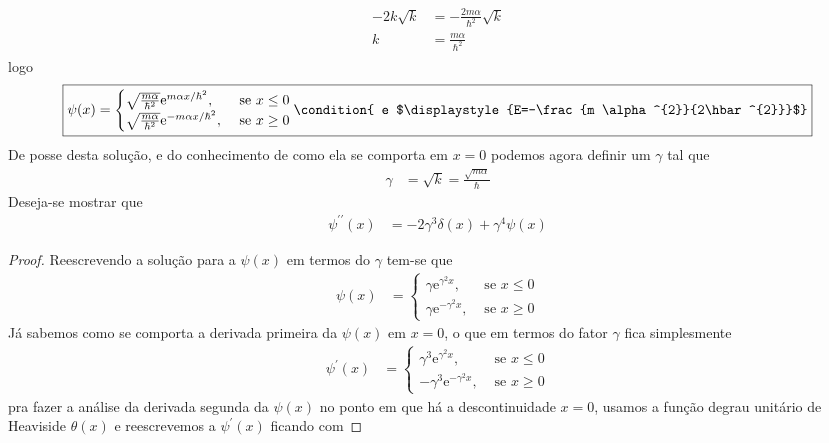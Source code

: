\begin{prob}
\begin{sol}
\begin{enumerate}[label=\alph *)]
\begin{align}
						\begin{split}
							-2k\sqrt{k} &= -\frac{2m \alpha}{\hbar^{2}}\sqrt{k}\\
							k &= \frac{m \alpha}{\hbar^{2}}
						\end{split}
					\end{align}
					logo
					\begin{align}
							\boxed{
								\psi(x) = 
								\begin{cases}
									\sqrt{\frac{m \alpha}{\hbar^{2}}}\mathrm{e}^{m\alpha  x/\hbar^{2}}, &\text{ se }x\leq 0\\
									\sqrt{\frac{m \alpha}{\hbar^{2}}}\mathrm{e}^{-m \alpha x/\hbar^{2}}, &\text{ se }x\geq 0
								\end{cases}
								\condition{ e $\displaystyle{E=-\frac{m \alpha^{2}}{2\hbar^{2}}}$}
							}
					\end{align}
					De posse desta solução, e do conhecimento de como ela se comporta em $x=0$ podemos agora definir um $\gamma$ tal que
					\begin{align}
						\gamma &= \sqrt{k} = \frac{\sqrt{m \alpha}}{\hbar}
					\end{align}
					Deseja-se mostrar que
					\begin{align}
						\psi^{\prime \prime}(x) &= -2 \gamma^{3} \delta(x)+\gamma^{4} \psi(x)
					\end{align}
					\begin{proof}
						Reescrevendo a solução para a $\psi(x)$ em termos do $\gamma$ tem-se que
						\begin{align}
							\psi(x) &=
							\begin{cases}
								\gamma \mathrm{e}^{\gamma^{2}x}, &\text{ se }x\leq 0\\
								\gamma \mathrm{e}^{-\gamma^{2}x}, &\text{ se }x\geq 0
							\end{cases}
						\end{align}
						Já sabemos como se comporta a derivada primeira da $\psi(x)$ em $x=0$, o que em termos do fator $\gamma$ fica simplesmente
						\begin{align}
							\psi^{\prime}(x) &=
							\begin{cases}
								\gamma^{3}\mathrm{e}^{\gamma^{2}x}, &\text{ se }x\leq 0\\
								-\gamma^{3}\mathrm{e}^{-\gamma^{2}x}, &\text{ se }x\geq 0
							\end{cases}
						\end{align}
						pra fazer a análise da derivada segunda da $\psi(x)$ no ponto em que há a descontinuidade $x=0$, usamos a função degrau unitário de Heaviside $\theta(x)$ e reescrevemos a $\psi^{\prime}(x)$ ficando com

\end{proof}
\end{enumerate}
\end{sol}
\end{prob}
